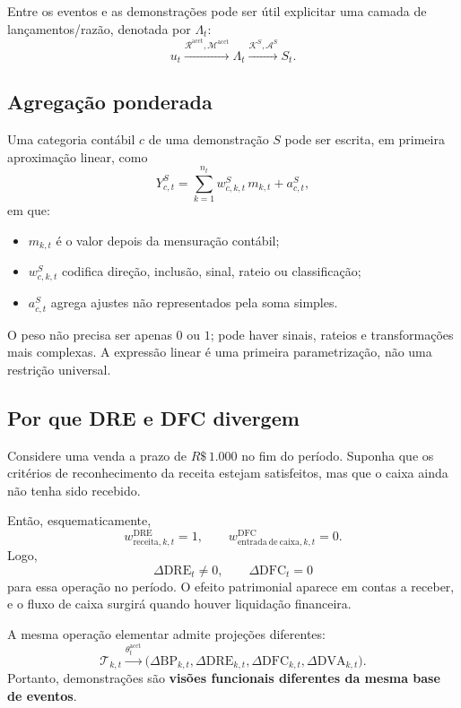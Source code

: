 \documentclass[11pt,a4paper]{article}
\newcommand{\BP}{\mathrm{BP}}
\newcommand{\DRE}{\mathrm{DRE}}
\newcommand{\DFC}{\mathrm{DFC}}
\newcommand{\DVA}{\mathrm{DVA}}
\newcommand{\cT}{\mathcal{T}}
\newcommand{\cA}{\mathcal{A}}
\newcommand{\cM}{\mathcal{M}}
\newcommand{\cK}{\mathcal{K}}
\newcommand{\cR}{\mathcal{R}}
\begin{document}
Entre os eventos e as demonstrações pode ser útil explicitar uma camada de lançamentos/razão, denotada por $\Lambda_t$:
\begin{equation}
\boxed{
u_t
\xrightarrow{\cR^{\mathrm{acct}},\cM^{\mathrm{acct}}}
\Lambda_t
\xrightarrow{\cK^S,\cA^S}
S_t.}
\label{eq:ledger}
\end{equation}

\subsection{Agregação ponderada}

Uma categoria contábil $c$ de uma demonstração $S$ pode ser escrita, em primeira aproximação linear, como
\begin{equation}
\boxed{Y^{S}_{c,t}=\sum_{k=1}^{n_t} w^{S}_{c,k,t}\,m_{k,t}+a^{S}_{c,t},}
\label{eq:agregacao-pesos}
\end{equation}
em que:
\begin{itemize}
    \item $m_{k,t}$ é o valor depois da mensuração contábil;
    \item $w^{S}_{c,k,t}$ codifica direção, inclusão, sinal, rateio ou classificação;
    \item $a^{S}_{c,t}$ agrega ajustes não representados pela soma simples.
\end{itemize}

O peso não precisa ser apenas $0$ ou $1$; pode haver sinais, rateios e transformações mais complexas. A expressão linear é uma primeira parametrização, não uma restrição universal.

\subsection{Por que DRE e DFC divergem}

Considere uma venda a prazo de $R\$\,1.000$ no fim do período. Suponha que os critérios de reconhecimento da receita estejam satisfeitos, mas que o caixa ainda não tenha sido recebido.

Então, esquematicamente,
\[
w^{\DRE}_{\mathrm{receita},k,t}=1,
\qquad
w^{\DFC}_{\mathrm{entrada\ de\ caixa},k,t}=0.
\]
Logo,
\[
\Delta \DRE_t\neq 0,
\qquad
\Delta \DFC_t=0
\]
para essa operação no período. O efeito patrimonial aparece em contas a receber, e o fluxo de caixa surgirá quando houver liquidação financeira.

\begin{formalizacao}
A mesma operação elementar admite projeções diferentes:
\[
\cT_{k,t}\xrightarrow{\theta_t^{\mathrm{acct}}}
\bigl(\Delta \BP_{k,t},\Delta \DRE_{k,t},\Delta \DFC_{k,t},\Delta \DVA_{k,t}\bigr).
\]
Portanto, demonstrações são \textbf{visões funcionais diferentes da mesma base de eventos}.
\end{formalizacao}
\end{document}
